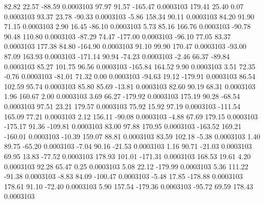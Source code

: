        82.82       22.57      -88.59     0.0003103
       97.97       91.57     -165.47     0.0003103
      179.41       25.40        0.07     0.0003103
       93.37       23.78      -90.33     0.0003103
       -5.86      158.34       90.11     0.0003103
       84.20       91.90       71.15     0.0003103
        2.90       16.45      -86.10     0.0003103
        5.73       85.16      166.76     0.0003103
      -90.78       90.48      110.80     0.0003103
      -87.29       74.47     -177.00     0.0003103
      -96.10       77.05       83.37     0.0003103
      177.38       84.80     -164.90     0.0003103
       91.10       99.90      170.47     0.0003103
      -93.00       87.09      163.93     0.0003103
     -171.14       90.94      -74.23     0.0003103
       -2.46       66.37      -89.84     0.0003103
       85.27      101.75       96.56     0.0003103
     -165.84      164.52        9.90     0.0003103
        3.51       72.35       -0.76     0.0003103
      -81.01       71.32        0.00     0.0003103
      -94.63       19.12     -179.91     0.0003103
       86.54      102.59       95.74     0.0003103
       85.80       85.69      -13.81     0.0003103
       82.60       90.19       68.31     0.0003103
        1.96      160.67        2.00     0.0003103
        3.69       66.27     -179.92     0.0003103
      175.19       90.28      -68.54     0.0003103
       97.51       23.21      179.57     0.0003103
       75.92       15.92       97.19     0.0003103
     -111.54      165.09       77.21     0.0003103
        2.12      156.11      -90.08     0.0003103
       -4.88       67.69      179.15     0.0003103
     -175.17       91.36     -109.81     0.0003103
       83.00       97.88      170.95     0.0003103
     -163.52      169.21     -160.01     0.0003103
      -10.39      159.07       88.81     0.0003103
       83.59      102.18       -5.38     0.0003103
        1.40       89.75      -65.20     0.0003103
       -7.04       90.16      -21.53     0.0003103
        1.16       90.71      -21.03     0.0003103
       69.95       13.83      -77.52     0.0003103
      178.93      101.01     -171.31     0.0003103
      168.53       19.61        4.20     0.0003103
       92.28       65.47        0.25     0.0003103
        5.08       22.12     -179.99     0.0003103
        5.36      111.22      -91.38     0.0003103
       -8.83       84.09     -100.47     0.0003103
       -5.48       17.85     -178.88     0.0003103
      178.61       91.10      -72.40     0.0003103
        5.90      157.54     -179.36     0.0003103
      -95.72       69.59      178.43     0.0003103
